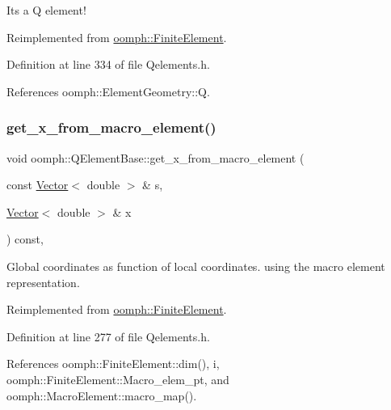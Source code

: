 It\textquotesingle{}s a Q element! 



Reimplemented from \hyperlink{classoomph_1_1FiniteElement_a66de72bbd8d710fd5f456c72433c34a7}{oomph\+::\+Finite\+Element}.



Definition at line 334 of file Qelements.\+h.



References oomph\+::\+Element\+Geometry\+::Q.

\mbox{\label{classoomph_1_1QElementBase_a9382eae5e06bceba2d107592ad111075}} 
\subsubsection{\texorpdfstring{get\+\_\+x\+\_\+from\+\_\+macro\+\_\+element()}{get\_x\_from\_macro\_element()}\hspace{0.1cm}{\footnotesize\ttfamily [1/2]}}
{\footnotesize\ttfamily void oomph\+::\+Q\+Element\+Base\+::get\+\_\+x\+\_\+from\+\_\+macro\+\_\+element (\begin{DoxyParamCaption}\item[{const \hyperlink{classoomph_1_1Vector}{Vector}$<$ double $>$ \&}]{s,  }\item[{\hyperlink{classoomph_1_1Vector}{Vector}$<$ double $>$ \&}]{x }\end{DoxyParamCaption}) const\hspace{0.3cm}{\ttfamily [inline]}, {\ttfamily [virtual]}}



Global coordinates as function of local coordinates. using the macro element representation. 



Reimplemented from \hyperlink{classoomph_1_1FiniteElement_abe28529e35222f294b19429dfeb83fa1}{oomph\+::\+Finite\+Element}.



Definition at line 277 of file Qelements.\+h.



References oomph\+::\+Finite\+Element\+::dim(), i, oomph\+::\+Finite\+Element\+::\+Macro\+\_\+elem\+\_\+pt, and oomph\+::\+Macro\+Element\+::macro\+\_\+map().

